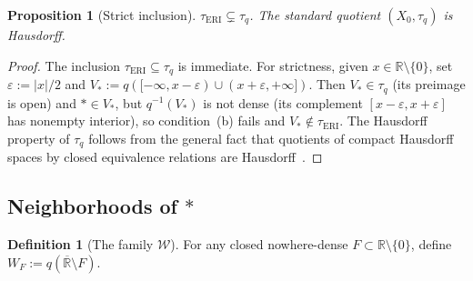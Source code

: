 \documentclass[11pt]{article}
\newtheorem{proposition}[theorem]{Proposition}
\theoremstyle{definition}
\newtheorem{definition}[theorem]{Definition}
\theoremstyle{remark}
\begin{document}
\begin{proposition}[Strict inclusion]\label{prop:strict}
$\tau_{\mathrm{ERI}} \subsetneq \tau_q$.
The standard quotient $(X_0, \tau_q)$ is Hausdorff.
\end{proposition}
\begin{proof}
The inclusion $\tau_{\mathrm{ERI}} \subseteq \tau_q$ is immediate.
For strictness, given $x \in \mathbb{R}\setminus\{0\}$, set
$\varepsilon := |x|/2$ and
$V_\ast := q([-\infty, x-\varepsilon) \cup (x+\varepsilon, +\infty])$.
Then $V_\ast \in \tau_q$ (its preimage is open) and $\ast \in V_\ast$,
but $q^{-1}(V_\ast)$ is not dense (its complement
$[x-\varepsilon, x+\varepsilon]$ has nonempty interior), so
condition~(b) fails and $V_\ast \notin \tau_{\mathrm{ERI}}$.
The Hausdorff property of $\tau_q$ follows from the general fact that
quotients of compact Hausdorff spaces by closed equivalence relations
are Hausdorff~\cite[2.4.15]{bib:engelking}.
\end{proof}

\subsection{Neighborhoods of \texorpdfstring{$\ast$}{*}}

\begin{definition}[The family $\mathcal{W}$]\label{def:WF}
For any closed nowhere-dense $F \subset \mathbb{R}\setminus\{0\}$,
define $W_F := q(\overline{\mathbb{R}} \setminus F)$.
\end{definition}
\end{document}
